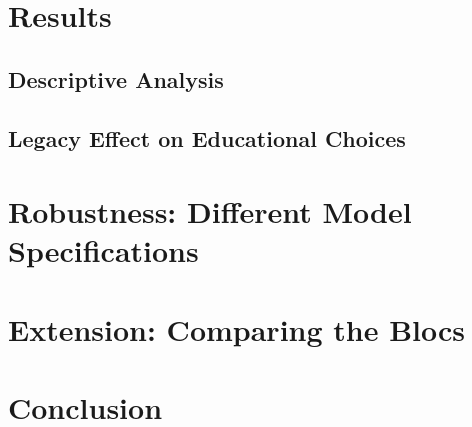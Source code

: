 \documentclass[a4paper, oneside, hyperfootnotes = false]{article}
\begin{document}
{\section{Results}
\label{results}

\subsection{Descriptive Analysis}
\label{descriptives}

\subsection{Legacy Effect on Educational Choices}
\label{educational}

\section{Robustness: Different Model Specifications}
\label{robustness}

\section{Extension: Comparing the Blocs}
\label{Extension}

\section{Conclusion}
\label{conclusion}


{}

\makeatletter %


\label{references}

\makeatother

\vspace{-.3cm}

\clearpage

}
\end{document}
